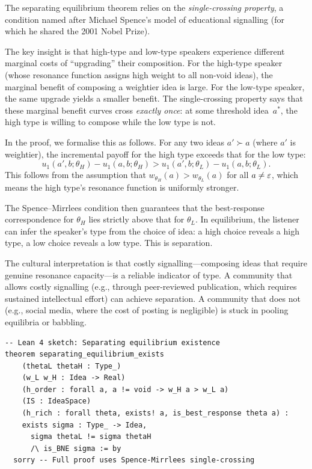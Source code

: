 \begin{remark}
The separating equilibrium theorem relies on the \emph{single-crossing
property}, a condition named after Michael Spence's model of
educational signalling (for which he shared the 2001 Nobel Prize).

The key insight is that high-type and low-type speakers experience
different marginal costs of ``upgrading'' their composition.  For
the high-type speaker (whose resonance function assigns high weight
to all non-void ideas), the marginal benefit of composing a weightier
idea is large.  For the low-type speaker, the same upgrade yields a
smaller benefit.  The single-crossing property says that these
marginal benefit curves cross \emph{exactly once}: at some threshold
idea~$a^*$, the high type is willing to compose while the low type
is not.

In the proof, we formalise this as follows.  For any two ideas
$a' \succ a$ (where $a'$ is weightier), the incremental payoff for
the high type exceeds that for the low type:
\[
  u_1(a', b; \theta_H) - u_1(a, b; \theta_H) > u_1(a', b; \theta_L) - u_1(a, b; \theta_L).
\]
This follows from the assumption that $w_{\theta_H}(a) > w_{\theta_L}(a)$
for all $a \neq \varepsilon$, which means the high type's resonance function
is uniformly stronger.

The Spence--Mirrlees condition then guarantees that the best-response
correspondence for $\theta_H$ lies strictly above that for $\theta_L$.
In equilibrium, the listener can infer the speaker's type from the
choice of idea: a high choice reveals a high type, a low choice
reveals a low type.  This is separation.

The cultural interpretation is that costly signalling---composing
ideas that require genuine resonance capacity---is a reliable indicator
of type.  A community that allows costly signalling (e.g., through
peer-reviewed publication, which requires sustained intellectual
effort) can achieve separation.  A community that does not (e.g.,
social media, where the cost of posting is negligible) is stuck
in pooling equilibria or babbling.
\end{remark}

\begin{lstlisting}
-- Lean 4 sketch: Separating equilibrium existence
theorem separating_equilibrium_exists
    (thetaL thetaH : Type_)
    (w_L w_H : Idea -> Real)
    (h_order : forall a, a != void -> w_H a > w_L a)
    (IS : IdeaSpace)
    (h_rich : forall theta, exists! a, is_best_response theta a) :
    exists sigma : Type_ -> Idea,
      sigma thetaL != sigma thetaH
      /\ is_BNE sigma := by
  sorry -- Full proof uses Spence-Mirrlees single-crossing
\end{lstlisting}

